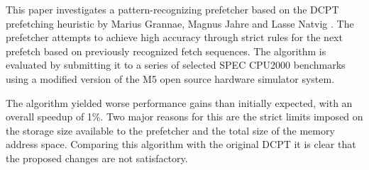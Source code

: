 This paper investigates a pattern-recognizing prefetcher based on the DCPT prefetching heuristic by Marius Grannae, Magnus Jahre and Lasse Natvig \cite{reference:jahre}. The prefetcher attempts to achieve high accuracy through strict rules for the next prefetch based on previously recognized fetch sequences.
The algorithm is evaluated by submitting it to a series of selected SPEC CPU2000 benchmarks using a modified version of the M5 open source hardware simulator system.

The algorithm yielded worse performance gains than initially expected, with an overall speedup of 1\%. Two major reasons for this are the strict limits imposed on the storage size available to the prefetcher and the total size of the memory address space. Comparing this algorithm with the original DCPT it is clear that the proposed changes are not satisfactory.
